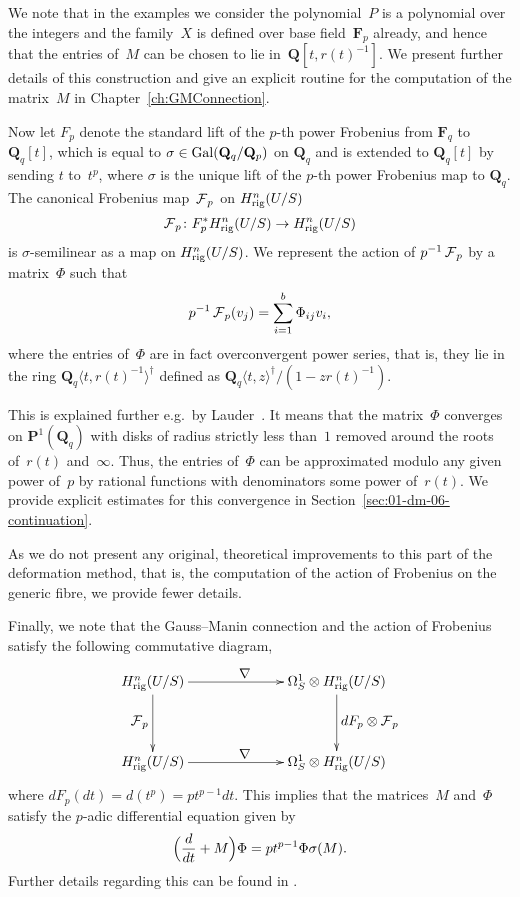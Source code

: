 We note that in the examples we consider the polynomial~$P$ is a polynomial 
over the integers and the family~$X$ is defined over base field~$\mathbf{F}_p$ 
already, and hence that the entries of~$M$ can be chosen to lie 
in~$\mathbf{Q}[t,r(t)^{-1}]$.  We present further details of this construction 
and give an explicit routine for the computation of the matrix~$M$ 
in Chapter~\ref{ch:GMConnection}.

Now let $F_p$ denote the standard lift of the $p$-th power Frobenius 
from $\mathbf{F}_q$ to $\mathbf{Q}_q[t]$, which is equal to 
$\sigma \in \operatorname{Gal}(\mathbf{Q}_q/\mathbf{Q}_p)$ on $\mathbf{Q}_q$ and 
is extended to $\mathbf{Q}_q[t]$ by sending $t$ to~$t^p$, where $\sigma$ 
is the unique lift of the $p$-th power Frobenius map to $\mathbf{Q}_q$.  
The canonical Frobenius map~$\operatorname{\mathcal{F}}_p$ on $H_{\text{rig}}^{n}(U/S)$
\begin{equation*}
\operatorname{\mathcal{F}}_p \colon F_p^{*} H_{\text{rig}}^{n}(U/S) \rightarrow H_{\text{rig}}^{n}(U/S)
\end{equation*}
is $\sigma$-semilinear as a map on $H_{\text{rig}}^{n}(U/S)$.  We represent 
the action of $p^{-1} \operatorname{\mathcal{F}}_p$ by a matrix~$\Phi$ such that 
\begin{equation*}
p^{-1} \operatorname{\mathcal{F}}_p (v_j) = \sum_{i=1}^{b} \Phi_{ij} v_i,
\end{equation*}
where the entries of~$\Phi$ are in fact overconvergent power series, 
that is, they lie in the ring $\mathbf{Q}_q\langle t, r(t)^{-1}\rangle^{\dagger}$ 
defined as $\mathbf{Q}_q \langle t, z \rangle^{\dagger} / (1 - z r(t)^{-1})$.

This is explained further e.g.\ by Lauder~\citep[\S 3.5]{Lauder2006}.  
It means that the matrix~$\Phi$ converges on $\mathbf{P}^{1}(\mathbf{Q}_q)$ 
with disks of radius strictly less than~$1$ removed around the roots of~$r(t)$ 
and~$\infty$.  Thus, the entries of~$\Phi$ can be approximated modulo 
any given power of~$p$ by rational functions with denominators some 
power of~$r(t)$.  We provide explicit estimates for this convergence 
in Section~\ref{sec:01-dm-06-continuation}.

As we do not present any original, theoretical improvements to this part of 
the deformation method, that is, the computation of the action of Frobenius 
on the generic fibre, we provide fewer details.

Finally, we note that the Gauss--Manin connection and the action of 
Frobenius satisfy the following commutative diagram,
\begin{equation*}
\def\labelstyle{\textstyle}
\xymatrix@C=6.8em@R=4em{
\Hrig^{n}(U/S) \ar[d]_{\Frob_p} \ar[r]^{\nabla} & 
\Omega_{S}^{1} \otimes \Hrig^{n}(U/S) \ar[d]^{d F_p \otimes \Frob_p} \\
\Hrig^{n}(U/S) \ar[r]^{\nabla} & 
\Omega_{S}^{1} \otimes \Hrig^{n}(U/S) 
}
\end{equation*}
where $d F_p (dt) = d(t^p) = p t^{p-1} dt$.  This implies that the 
matrices~$M$ and~$\Phi$ satisfy the $p$-adic differential equation given by 
\begin{equation*}
\Bigl( \frac{d}{dt} + M \Bigr) \Phi = p t^{p-1} \Phi \sigma(M).
\end{equation*}
Further details regarding this can be found in \citep[\S 5]{Gerkmann2007}.

